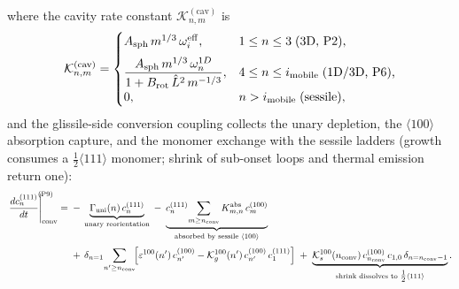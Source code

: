 where the cavity rate constant $\mathcal{K}^{(\mathrm{cav})}_{n,m}$ is
\begin{equation}\label{eq:K_cav}
    \mathcal{K}_{n,m}^{(\mathrm{cav})} =
    \begin{cases}
        A_{\mathrm{sph}}\,m^{1/3}\,\omega_i^{\mathrm{eff}},
        & 1 \leq n \leq 3\;\text{(3D, P2),} \\[5pt]
        \displaystyle
        \frac{A_{\mathrm{sph}}\,m^{1/3}\,\omega_n^{1D}}
             {1 + B_{\mathrm{rot}}\,\hat{L}^2\,m^{-1/3}},
        & 4 \leq n \leq i_{\rm mobile}\;\text{(1D/3D, P6),} \\[5pt]
        0, & n > i_{\rm mobile}\;\text{(sessile)},
    \end{cases}
\end{equation}
and the glissile-side conversion coupling collects the unary depletion, the
$\langle100\rangle$ absorption capture, and the monomer exchange with the
sessile ladders (growth consumes a $\tfrac12\langle111\rangle$ monomer; shrink
of sub-onset loops and thermal emission return one):
\begin{equation}\label{eq:conv_111}
\begin{split}
\left.\frac{dc^{(111)}_n}{dt}\right|_{\mathrm{conv}}^{\!\!\!(\mathrm{P9})}
   = {} & -\,\underbrace{\Gamma_{\rm uni}(n)\,c^{(111)}_n}_{\text{unary reorientation}}
   \;-\; \underbrace{c^{(111)}_n\!\sum_{m\geq n_{\rm conv}} K^{\rm abs}_{m,n}\,c^{(100)}_m}_{\text{absorbed by sessile }\langle100\rangle}
   \\[2pt]
   & +\,\delta_{n=1}\!\sum_{n'\geq n_{\rm conv}}\!\Bigl[
       \varepsilon^{100}(n')\,c^{(100)}_{n'}
     - \mathcal{K}^{100}_{g}(n')\,c^{(100)}_{n'}\,c^{(111)}_{1}\Bigr]
   \;+\; \underbrace{\mathcal{K}^{100}_{s}(n_{\rm conv})\,c^{(100)}_{n_{\rm conv}}\,c_{1,0}\,\delta_{n=n_{\rm conv}-1}}_{\text{shrink dissolves to }\tfrac12\langle111\rangle}.
\end{split}
\end{equation}

